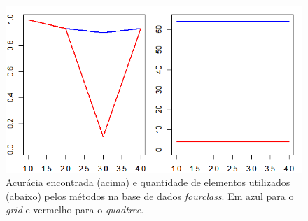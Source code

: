 \documentclass[conference]{IEEEtran}
\begin{document}
\begin{figure}[h]
\centerline{\includegraphics[width=0.9\columnwidth]{fig/four_acc.png}}
\caption{Acurácia encontrada (acima) e quantidade de elementos utilizados (abaixo) pelos métodos na base de dados \textit{fourclass}. Em azul para o \textit{grid} e vermelho para o \textit{quadtree}.}
\label{fouracc}
\end{figure}
\end{document}
